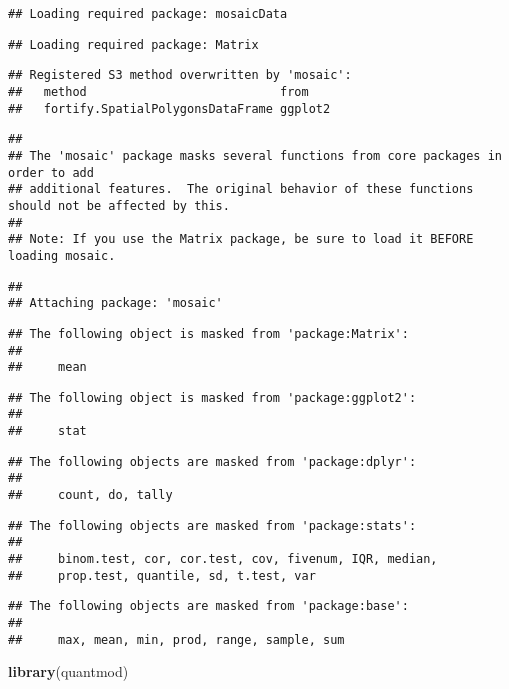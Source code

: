 \documentclass[]{article}
\newenvironment{Shaded}{\begin{snugshade}}{\end{snugshade}}
\newcommand{\KeywordTok}[1]{\textcolor[rgb]{0.13,0.29,0.53}{\textbf{#1}}}
\newcommand{\NormalTok}[1]{#1}
\begin{document}
\begin{verbatim}
## Loading required package: mosaicData
\end{verbatim}

\begin{verbatim}
## Loading required package: Matrix
\end{verbatim}

\begin{verbatim}
## Registered S3 method overwritten by 'mosaic':
##   method                           from   
##   fortify.SpatialPolygonsDataFrame ggplot2
\end{verbatim}

\begin{verbatim}
## 
## The 'mosaic' package masks several functions from core packages in order to add 
## additional features.  The original behavior of these functions should not be affected by this.
## 
## Note: If you use the Matrix package, be sure to load it BEFORE loading mosaic.
\end{verbatim}

\begin{verbatim}
## 
## Attaching package: 'mosaic'
\end{verbatim}

\begin{verbatim}
## The following object is masked from 'package:Matrix':
## 
##     mean
\end{verbatim}

\begin{verbatim}
## The following object is masked from 'package:ggplot2':
## 
##     stat
\end{verbatim}

\begin{verbatim}
## The following objects are masked from 'package:dplyr':
## 
##     count, do, tally
\end{verbatim}

\begin{verbatim}
## The following objects are masked from 'package:stats':
## 
##     binom.test, cor, cor.test, cov, fivenum, IQR, median,
##     prop.test, quantile, sd, t.test, var
\end{verbatim}

\begin{verbatim}
## The following objects are masked from 'package:base':
## 
##     max, mean, min, prod, range, sample, sum
\end{verbatim}

\begin{Shaded}
\begin{Highlighting}[]
\KeywordTok{library}\NormalTok{(quantmod)}
\end{Highlighting}
\end{Shaded}
\end{document}
